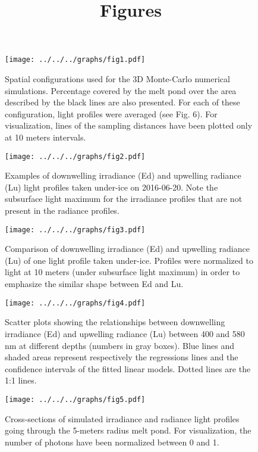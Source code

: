 \documentclass[12pt,a4paper]{scrartcl}
\title{Figures}
\date{}
\begin{document}
\maketitle

\begin{figure}[ht]
	\centering
	\texttt{[image: ../../../graphs/fig1.pdf]}
	\caption{Spatial configurations used for the 3D Monte-Carlo numerical simulations. Percentage covered by the melt pond over the area described by the black lines are also presented. For each of these configuration, light profiles were averaged (see Fig. 6). For visualization, lines of the sampling distances have been plotted only at 10 meters intervals.}
\end{figure}

\clearpage
\newpage

\begin{figure}[ht]
	\centering
	\texttt{[image: ../../../graphs/fig2.pdf]}
	\caption{Examples of downwelling irradiance (Ed) and upwelling radiance (Lu) light profiles taken under-ice on 2016-06-20. Note the subsurface light maximum for the irradiance profiles that are not present in the radiance profiles.}
\end{figure}

\clearpage
\newpage

\begin{figure}[ht]
	\centering
	\texttt{[image: ../../../graphs/fig3.pdf]}
	\caption{Comparison of downwelling irradiance (Ed) and upwelling radiance (Lu) of one light profile taken under-ice. Profiles were normalized to light at 10 meters (under subsurface light maximum) in order to emphasize the similar shape between Ed and Lu.}
\end{figure}

\clearpage
\newpage

\begin{figure}[ht]
	\centering
	\texttt{[image: ../../../graphs/fig4.pdf]}
	\caption{Scatter plots showing the relationships between downwelling irradiance (Ed) and upwelling radiance (Lu) between 400 and 580 nm at different depths (numbers in gray boxes). Blue lines and shaded areas represent respectively the regressions lines and the confidence intervals of the fitted linear models. Dotted lines are the 1:1 lines.}
\end{figure}

\clearpage
\newpage

\begin{figure}[ht]
	\centering
	\texttt{[image: ../../../graphs/fig5.pdf]}
	\caption{Cross-sections of simulated irradiance and radiance light profiles going through the 5-meters radius melt pond. For visualization, the number of photons have been normalized between 0 and 1.}
\end{figure}
\end{document}
